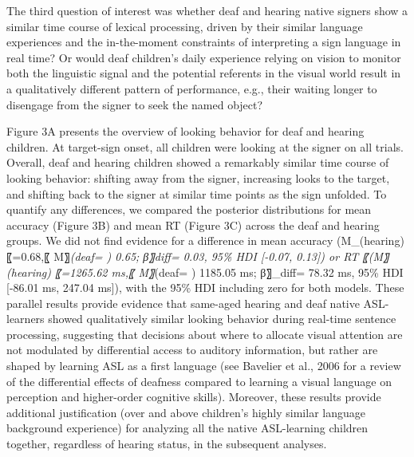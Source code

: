 \documentclass[oneside]{report}
\begin{document}
The third question of interest was whether deaf and hearing native
signers show a similar time course of lexical processing, driven by
their similar language experiences and the in-the-moment constraints of
interpreting a sign language in real time? Or would deaf children's
daily experience relying on vision to monitor both the linguistic signal
and the potential referents in the visual world result in a
qualitatively different pattern of performance, e.g., their waiting
longer to disengage from the signer to seek the named object?

Figure 3A presents the overview of looking behavior for deaf and hearing
children. At target-sign onset, all children were looking at the signer
on all trials. Overall, deaf and hearing children showed a remarkably
similar time course of looking behavior: shifting away from the signer,
increasing looks to the target, and shifting back to the signer at
similar time points as the sign unfolded. To quantify any differences,
we compared the posterior distributions for mean accuracy (Figure 3B)
and mean RT (Figure 3C) across the deaf and hearing groups. We did not
find evidence for a difference in mean accuracy (M\_(hearing) 〖=0.68,〖
M〗\emph{(deaf= ) 0.65; β〗\emph{diff= 0.03, 95\% HDI {[}-0.07, 0.13{]})
or RT 〖(M〗}(hearing) 〖=1265.62 ms,〖 M〗}(deaf= ) 1185.05 ms;
β〗\_diff= 78.32 ms, 95\% HDI {[}-86.01 ms, 247.04 ms{]}), with the 95\%
HDI including zero for both models. These parallel results provide
evidence that same-aged hearing and deaf native ASL-learners showed
qualitatively similar looking behavior during real-time sentence
processing, suggesting that decisions about where to allocate visual
attention are not modulated by differential access to auditory
information, but rather are shaped by learning ASL as a first language
(see Bavelier et al., 2006 for a review of the differential effects of
deafness compared to learning a visual language on perception and
higher-order cognitive skills). Moreover, these results provide
additional justification (over and above children's highly similar
language background experience) for analyzing all the native
ASL-learning children together, regardless of hearing status, in the
subsequent analyses.
\end{document}
